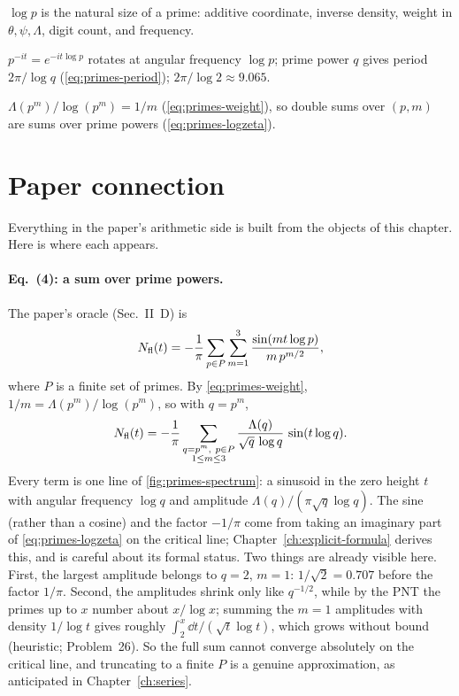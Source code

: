 \begin{keyideas}
\item $\log p$ is the natural size of a prime: additive coordinate, inverse density, weight in $\theta,\psi,\Lambda$, digit count, and frequency.
\item $p^{-it}=e^{-it\log p}$ rotates at angular frequency $\log p$; prime power $q$ gives period $2\pi/\log q$ (\cref{eq:primes-period}); $2\pi/\log2\approx9.065$.
\item $\Lambda(p^m)/\log(p^m)=1/m$ (\cref{eq:primes-weight}), so double sums over $(p,m)$ are sums over prime powers (\cref{eq:primes-logzeta}).
\end{keyideas}

\section{Paper connection}\label{sec:primes-paper}

Everything in the paper's arithmetic side is built from the objects of this chapter. Here is where each appears.

\paragraph{Eq.~(4): a sum over prime powers.} The paper's oracle (Sec.~II~D) is
\[
N_{\rm fl}(t)=-\frac1\pi\sum_{p\in P}\sum_{m=1}^{3}\frac{\sin(mt\log p)}{m\,p^{m/2}},
\]
where $P$ is a finite set of primes. By \cref{eq:primes-weight}, $1/m=\Lambda(p^m)/\log(p^m)$, so with $q=p^m$,
\[
N_{\rm fl}(t)=-\frac1\pi\sum_{\substack{q=p^m,\ p\in P\\ 1\le m\le3}}\frac{\Lambda(q)}{\sqrt q\,\log q}\,\sin(t\log q).
\]
Every term is one line of \cref{fig:primes-spectrum}: a sinusoid in the zero height $t$ with angular frequency $\log q$ and amplitude $\Lambda(q)/(\pi\sqrt q\log q)$. The sine (rather than a cosine) and the factor $-1/\pi$ come from taking an imaginary part of \cref{eq:primes-logzeta} on the critical line; Chapter~\ref{ch:explicit-formula} derives this, and is careful about its formal status. Two things are already visible here. First, the largest amplitude belongs to $q=2$, $m=1$: $1/\sqrt2=0.707$ before the factor $1/\pi$. Second, the amplitudes shrink only like $q^{-1/2}$, while by the PNT the primes up to $x$ number about $x/\log x$; summing the $m=1$ amplitudes with density $1/\log t$ gives roughly $\int_2^x\dd t/(\sqrt t\log t)$, which grows without bound (heuristic; Problem~26). So the full sum cannot converge absolutely on the critical line, and truncating to a finite $P$ is a genuine approximation, as anticipated in Chapter~\ref{ch:series}.


